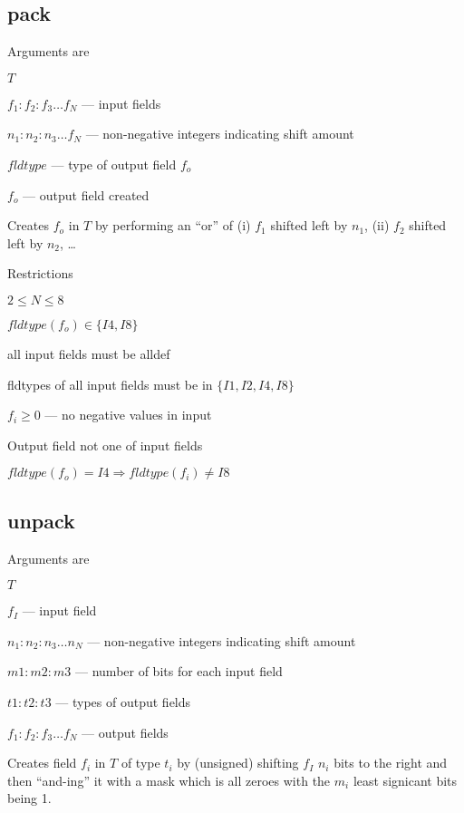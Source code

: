 \documentclass{report}
\begin{document}
\subsection{pack}
\label{pack}

Arguments are
\be
\item \(T\)
\item \(f_1:f_2:f_3 \ldots f_N\) --- input fields
\item \(n_1:n_2:n_3 \ldots f_N\) --- non-negative integers indicating shift
amount
\item \(fldtype\) --- type of output field \(f_o\)
\item \(f_o\)  --- output field created
\ee

Creates \(f_o\) in \(T\) by performing an ``or'' of 
(i) \(f_1\) shifted left by \(n_1\), 
(ii) \(f_2\) shifted left by \(n_2\), \ldots

Restrictions
\be
\item \(2 \leq N \leq 8 \)
\item \(fldtype(f_o) \in \{I4, I8\}\)
\item all input fields must be alldef
\item fldtypes of all input fields must be in \(\{I1, I2, I4, I8\}\)
\item \(f_i \geq 0 \) --- no negative values in input 
\item Output field not one of input fields
\item \(fldtype(f_o) = I4 \Rightarrow fldtype(f_i) \neq I8\)
\ee

\subsection{unpack}
\label{unpack}

Arguments are
\be
\item \(T\)
\item \(f_I\)  --- input field 
\item \(n_1:n_2:n_3 \ldots n_N\) --- non-negative integers indicating shift
amount
\item \(m1:m2:m3\) --- number of bits for each input field 
\item \(t1:t2:t3\) --- types of output fields
\item \(f_1:f_2:f_3 \ldots f_N\) --- output fields 
\ee

Creates field \(f_i\) in \(T\) of type \(t_i\) by (unsigned) shifting
\(f_I\) \(n_i\) bits to the right and then ``and-ing'' it with a mask
which is all zeroes with the \(m_i\) least signicant bits being 1. 
\end{document}
